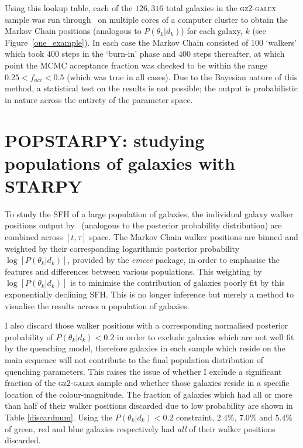 Using this lookup table, each of the $126,316$ total galaxies in the \textsc{gz2-galex} sample was run through \starpy ~on multiple cores of a computer cluster to obtain the Markov Chain positions (analogous to $P(\theta_k|d_k)$) for each galaxy, $k$ (see Figure~\ref{one_example}). In each case the Markov Chain consisted of $100$ `walkers' which took $400$ steps in the `burn-in' phase and $400$ steps thereafter, at which point the MCMC acceptance fraction was checked to be within the range $0.25 < f_{acc} < 0.5$ (which was true in all cases). Due to the Bayesian nature of this method, a statistical test on the results is not possible; the output is probabilistic in nature across the entirety of the parameter space.

\section{POPSTARPY: studying populations of galaxies with STARPY}\label{popstarpy}

To study the SFH of a large population of galaxies, the individual galaxy walker positions output by \starpy ~(analogous to the posterior probability distribution) are combined across $[t, \tau]$ space. The Markov Chain walker positions are binned and weighted by their corresponding logarithmic posterior probability $\log [P(\theta_k|d_k)]$, provided by the \emph{emcee} package, in order to emphasise the features and differences between various populations. This weighting by $\log [P(\theta_k|d_k)]$ is to minimise the contribution of galaxies poorly fit by this exponentially declining SFH. This is no longer inference but merely a method to visualise the results across a population of galaxies.

I also discard those walker positions with a corresponding normalised posterior probability of $P(\theta_k|d_k) < 0.2$ in order to exclude galaxies which are not well fit by the quenching model, therefore galaxies in each sample which reside on the main sequence will not contribute to the final population distribution of quenching parameters. This raises the issue of whether I exclude a significant fraction of the \textsc{gz2-galex} sample and whether those galaxies reside in a specific location of the colour-magnitude. The fraction of galaxies which had all or more than half of their walker positions discarded due to low probability are shown in Table \ref{discardnum}. Using the $P(\theta_k|d_k) < 0.2$ constraint, $2.4\%$, $7.0\%$ and $5.4\%$ of green, red and blue galaxies respectively had \emph{all} of their walker positions discarded. 

